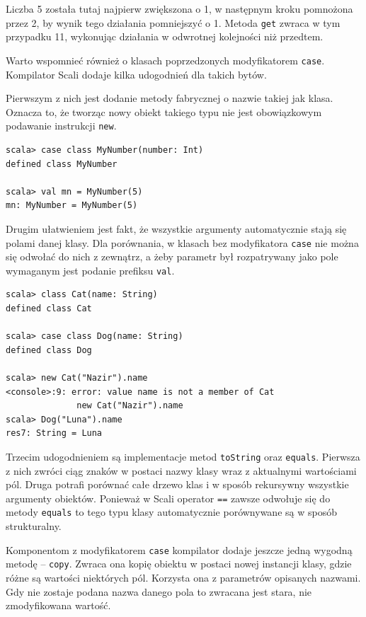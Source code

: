 \documentclass[brudnopis]{xmgr}
\begin{document}
Liczba 5 została tutaj najpierw zwiększona o 1, w następnym kroku pomnożona przez 2, by wynik tego działania pomniejszyć o 1. Metoda \texttt{get} zwraca w tym przypadku 11, wykonując działania w odwrotnej kolejności niż przedtem.

Warto wspomnieć również o klasach poprzedzonych modyfikatorem \texttt{case}. Kompilator Scali dodaje kilka udogodnień dla takich bytów. 

Pierwszym z nich jest dodanie metody fabrycznej o nazwie takiej jak klasa. Oznacza to, że tworząc nowy obiekt takiego typu nie jest obowiązkowym podawanie instrukcji \texttt{new}. 

\begin{verbatim}
scala> case class MyNumber(number: Int)
defined class MyNumber

scala> val mn = MyNumber(5)
mn: MyNumber = MyNumber(5)
\end{verbatim}

Drugim ułatwieniem jest fakt, że wszystkie argumenty automatycznie stają się polami danej klasy. Dla porównania, w klasach bez modyfikatora \texttt{case} nie można się odwołać do nich z zewnątrz, a żeby parametr był rozpatrywany jako pole wymaganym jest podanie prefiksu \texttt{val}.

\begin{verbatim}
scala> class Cat(name: String)
defined class Cat

scala> case class Dog(name: String)
defined class Dog

scala> new Cat("Nazir").name
<console>:9: error: value name is not a member of Cat
              new Cat("Nazir").name
scala> Dog("Luna").name
res7: String = Luna           
\end{verbatim}

Trzecim udogodnieniem są implementacje metod \texttt{toString} oraz \texttt{equals}. Pierwsza z nich zwróci ciąg znaków w postaci nazwy klasy wraz z aktualnymi wartościami pól. Druga potrafi porównać całe drzewo klas i w sposób rekursywny wszystkie argumenty obiektów. Ponieważ w Scali operator \texttt{==} zawsze odwołuje się do metody \texttt{equals} to tego typu klasy automatycznie porównywane są w sposób strukturalny.    

Komponentom z modyfikatorem \texttt{case} kompilator dodaje jeszcze jedną wygodną metodę -- \texttt{copy}. Zwraca ona kopię obiektu w postaci nowej instancji klasy, gdzie różne są wartości niektórych pól. Korzysta ona z parametrów opisanych nazwami. Gdy nie zostaje podana nazwa danego pola to zwracana jest stara, nie zmodyfikowana wartość. 
\end{document}
